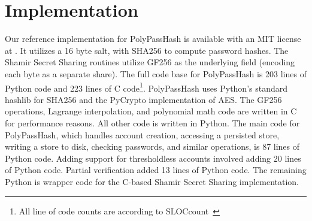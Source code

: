 \section{Implementation}
\label{sec-implementation}


Our reference implementation for PolyPassHash is available with an MIT license 
at \showurlx.  It utilizes
a 16 byte salt, with SHA256 to compute password hashes.   The Shamir
Secret Sharing routines
utilize GF256 as the underlying field (encoding each byte as a separate
share).   %
The full code base for PolyPassHash is 203 lines of Python code and
223 lines of C code\footnote{
All line of code counts are according to SLOCcount~\cite{wheeler-sloccount}}.   
PolyPassHash uses Python's standard hashlib for SHA256 and the PyCrypto
implementation of AES.
The GF256 operations, Lagrange interpolation, and polynomial math code
are written in C for performance reasons.   All other code is written in 
Python.  The main code for PolyPassHash, which handles account
creation, accessing a persisted store, writing a store to disk,
checking passwords, and similar operations, is 87 lines of Python code.
Adding support for thresholdless accounts involved adding 20 lines of Python
code.   Partial verification added 13 lines of Python code.
The remaining Python is wrapper code for the C-based 
Shamir Secret Sharing implementation.




